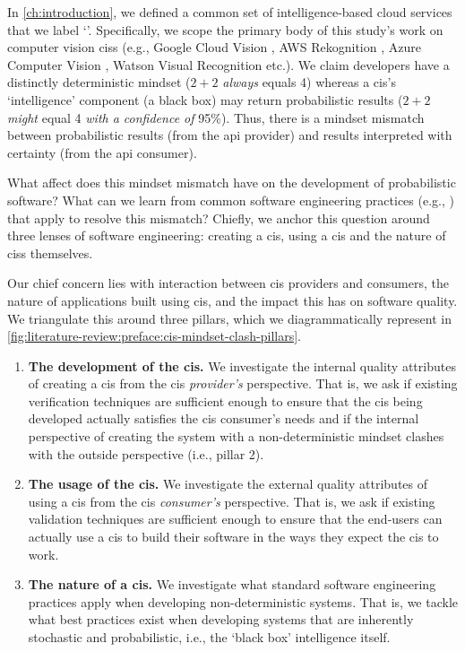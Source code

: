 \label{sec:literature-review:preface}

In \cref{ch:introduction}, we defined a common set of intelligence-based cloud services that we label `'. Specifically, we scope the primary body of this study's work on computer vision \glspl{cis} (e.g., Google Cloud Vision \citep{GoogleCloud:Home}, AWS Rekognition \citep{AWS:Home}, Azure Computer Vision \citep{Azure:Home}, Watson Visual Recognition \citep{IBM:Home} etc.). We claim developers have a distinctly deterministic mindset ($2+2$ \textit{always}  equals 4) whereas a \gls{cis}'s `intelligence' component (a black box) may return probabilistic results ($2+2$ \textit{might} equal 4 \textit{with a confidence of} 95\%). Thus, there is a mindset mismatch between probabilistic results (from the \gls{api} provider) and results interpreted with certainty (from the \gls{api} consumer).

What affect does this mindset mismatch have on the development of probabilistic software? What can we learn from common software engineering practices (e.g., \citep{Pressman:2005vf,Sommerville:2011uc}) that apply to resolve this mismatch? Chiefly, we anchor this question around three lenses of software engineering: creating a \gls{cis}, using a \gls{cis} and the nature of \glspl{cis} themselves.

Our chief concern lies with interaction between \gls{cis} providers and consumers, the nature of applications built using \gls{cis}, and the impact this has on software quality. We triangulate this around three pillars, which we diagrammatically represent in \cref{fig:literature-review:preface:cis-mindset-clash-pillars}.
 
\begin{enumerate}[label=\textbf{\arabic*}.]
\item \textbf{The development of the \gls{cis}.} We investigate the internal quality attributes of creating a \gls{cis} from the \gls{cis} \textit{provider's} perspective. That is, we ask if existing verification techniques are sufficient enough to ensure that the \gls{cis} being developed actually satisfies the \gls{cis} consumer's needs and if the internal perspective of creating the system with a non-deterministic mindset clashes with the outside perspective (i.e., pillar 2).
\item \textbf{The usage of the \gls{cis}.} We investigate the external quality attributes of using a \gls{cis} from the \gls{cis} \textit{consumer's} perspective. That is, we ask if existing validation techniques are sufficient enough to ensure that the end-users can actually use a \gls{cis} to build their software in the ways they expect the \gls{cis} to work.
\item \textbf{The nature of a \gls{cis}.} We investigate what standard software engineering practices apply when developing non-deterministic systems. That is, we tackle what best practices exist when developing systems that are inherently stochastic and probabilistic, i.e., the `black box' intelligence itself.
\end{enumerate}

